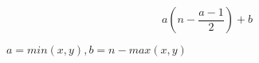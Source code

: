 \documentclass{article}
\begin{document}
\[ a\left ( n - \frac{a - 1}{2} \right ) + b \]
\pagebreak

$ a = min \left ( x , y \right ), b = n - max \left ( x , y \right ) $
\pagebreak
\end{document}
